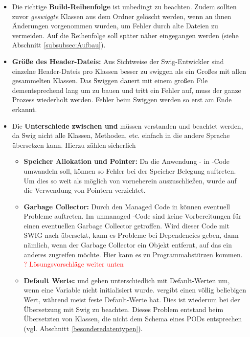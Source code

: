 \begin{itemize}
\item Die richtige \textbf{Build-Reihenfolge} ist unbedingt zu beachten. Zudem sollten zuvor \emph{geswiggte} Klassen aus dem Ordner gelöscht werden, wenn an ihnen Änderungen vorgenommen wurden, um Fehler durch alte Dateien zu vermeiden. Auf die Reihenfolge soll später näher eingegangen werden (siehe Abschnitt \ref{subsubsec:Aufbau}).
\item \textbf{Größe des Header-Dateis:} Aus Sichtweise der Swig-Entwickler sind einzelne Header-Dateis pro Klassen besser zu swiggen als ein Großes mit allen gesammelten Klassen. Das Swiggen dauert mit einem großen File dementsprechend lang um zu bauen und tritt ein Fehler auf, muss der ganze Prozess wiederholt werden. Fehler beim Swiggen werden so erst am Ende erkannt. %
\item Die \textbf{Unterschiede zwischen \CC und \CS} müssen verstanden und beachtet werden, da Swig nicht alle Klassen, Methoden, etc. einfach in die andere Sprache übersetzen kann. Hierzu zählen sicherlich 
	\begin{itemize}
	\item \textbf{Speicher Allokation und Pointer:}
	Da die Anwendung \CC - in \CS -Code umwandeln soll, können so Fehler bei der Speicher Belegung auftreten. Um dies so weit als möglich von vorneherein auszuschließen, wurde auf die Verwendung von Pointern verzichtet.
	\item \textbf{Garbage Collector:} Durch den Managed Code in \CS können eventuell Probleme auftreten. Im unmanaged \CC -Code sind keine Vorbereitungen für einen eventuellen Garbage Collector getroffen. Wird dieser Code mit SWIG nach \CS übersetzt, kann es Probleme bei Dependencies geben, dann nämlich, wenn der Garbage Collector ein Objekt entfernt, auf das ein anderes zugreifen möchte. Hier kann es zu Programmabstürzen kommen. \textcolor{red}{? Lösungsvorschläge weiter unten}
	\item \textbf{Default Werte:} \CC und \CS gehen unterschiedlich mit Default-Werten um, wenn eine Variable nicht initialisiert wurde. \CC vergibt einen völlig beliebigen Wert, während \CS meist feste Default-Werte hat. Dies ist wiederum bei der Übersetzung mit Swig zu beachten. Dieses Problem entstand beim Übersetzten von Klassen, die nicht dem Schema eines PODs entsprechen (vgl. Abschnitt \ref{besonderedatentypen}).

\end{itemize}
\end{itemize}
